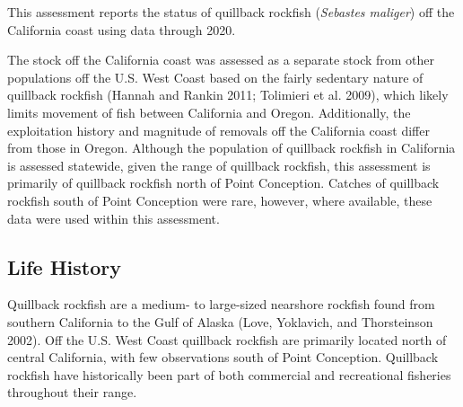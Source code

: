 \documentclass[11pt,
  english,
  a4paper,
]{article}
\begin{document}
\leavevmode\tagmcend\tagstructend


This assessment reports the status of quillback rockfish (\emph{Sebastes maliger}) off the California coast using data through 2020.

\leavevmode\tagmcend\tagstructend\par


The stock off the California coast was assessed as a separate stock from other populations off the U.S. West Coast based on the fairly sedentary nature of quillback rockfish {(Hannah and Rankin 2011; Tolimieri et al. 2009)\leavevmode\tagmcend\tagstructend}, which likely limits movement of fish between California and Oregon. Additionally, the exploitation history and magnitude of removals off the California coast differ from those in Oregon. Although the population of quillback rockfish in California is assessed statewide, given the range of quillback rockfish, this assessment is primarily of quillback rockfish north of Point Conception. Catches of quillback rockfish south of Point Conception were rare, however, where available, these data were used within this assessment.

\leavevmode\tagmcend\tagstructend\par


\hypertarget{life-history}{%
\subsection{Life History}\label{life-history}}

\leavevmode\tagmcend\tagstructend


Quillback rockfish are a medium- to large-sized nearshore rockfish found from southern California to the Gulf of Alaska {(Love, Yoklavich, and Thorsteinson 2002)\leavevmode\tagmcend\tagstructend}. Off the U.S. West Coast quillback rockfish are primarily located north of central California, with few observations south of Point Conception. Quillback rockfish have historically been part of both commercial and recreational fisheries throughout their range.
\end{document}
